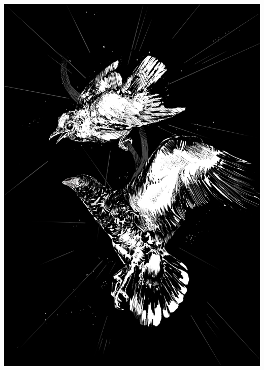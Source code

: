 \thispagestyle{empty}


 \afterpage{\restorepagecolor}


\begin{addmargin}[-1cm]{-4cm}
\begin{center}

    \begingroup
        \Huge\color{white}{\myTitle}
    \endgroup
    
    \medskip
    
    \spacedlowsmallcaps{\large\color{white}\myName}

    \vspace*{\fill}
    \begingroup
        \includegraphics[width=0.6\paperwidth, scale=0.8]{Assets/alcaracrara.png}
    \endgroup
    \vspace*{\fill}
\end{center}        
\end{addmargin}
